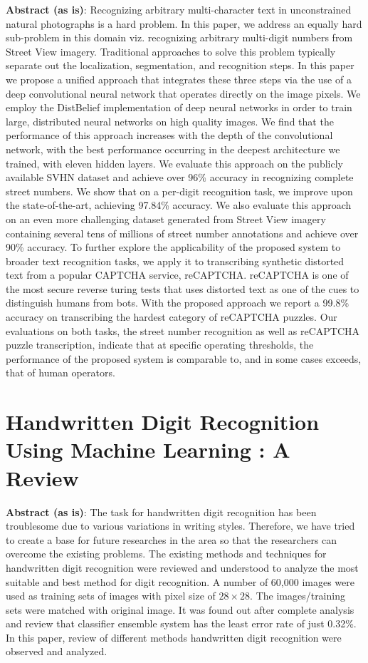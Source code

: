 \documentclass[12pt, a4paper]{report}
\begin{document}
\textbf{Abstract (as is)}: Recognizing arbitrary multi-character text in unconstrained natural photographs is a hard problem. In this paper, we address an equally hard sub-problem in this domain viz. recognizing arbitrary multi-digit numbers from Street View imagery. Traditional approaches to solve this problem typically separate out the localization, segmentation, and recognition steps. In this paper we propose a unified approach that integrates these three steps via the use of a deep convolutional neural network that operates directly on the image pixels. We employ the DistBelief \cite{art:lsddn} implementation of deep neural networks in order to train large, distributed neural networks on high quality images. We find that the performance of this approach increases with the depth of the convolutional network, with the best performance occurring in the deepest architecture we trained, with eleven hidden layers. We evaluate this approach on the publicly available SVHN dataset and achieve over 96\% accuracy in recognizing complete street numbers. We show that on a per-digit recognition task, we improve upon the state-of-the-art, achieving 97.84\% accuracy. We also evaluate this approach on an even more challenging dataset generated from Street View imagery containing several tens of millions of street number annotations and achieve over 90\% accuracy. To further explore the applicability of the proposed system to broader text recognition tasks, we apply it to transcribing synthetic distorted text from a popular CAPTCHA service, reCAPTCHA. reCAPTCHA is one of the most secure reverse turing tests that uses distorted text as one of the cues to distinguish humans from bots. With the proposed approach we report a 99.8\% accuracy on transcribing the hardest category of reCAPTCHA puzzles. Our evaluations on both tasks, the street number recognition as well as reCAPTCHA puzzle transcription, indicate that at specific operating thresholds, the performance of the proposed system is comparable to, and in some cases exceeds, that of human operators.
\section{Handwritten Digit Recognition Using Machine Learning : A Review}
\label{sec:litppr2}

\textbf{Abstract (as is)}: The task for handwritten digit recognition has been troublesome due to various variations in writing styles. Therefore, we have tried to create a base for future researches in the area so that the researchers can overcome the existing problems. The existing methods and techniques for handwritten digit recognition were reviewed and understood to analyze the most suitable and best method for digit recognition. A number of 60,000 images were used as training sets of images with pixel
size of $28\times 28$. The images/training sets were matched with original image. It was found out after complete analysis and review that classifier ensemble system has the least error rate of
just 0.32\%. In this paper, review of different methods handwritten digit recognition were observed and analyzed.
\end{document}
